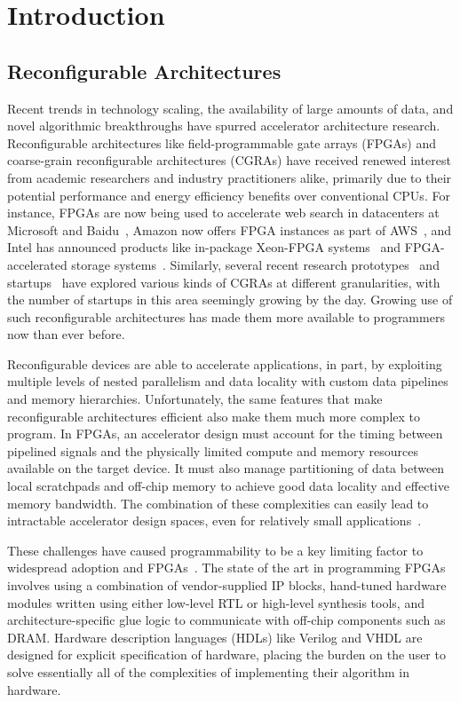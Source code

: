 \chapter{Introduction}
\label{intro}

\section{Reconfigurable Architectures}
Recent trends in technology scaling, the availability of large amounts of data,
and novel algorithmic breakthroughs have spurred accelerator architecture
research. Reconfigurable architectures like field-programmable gate arrays
(FPGAs) and coarse-grain reconfigurable architectures (CGRAs) have received
renewed interest from academic researchers and industry practitioners alike,
primarily due to their potential performance and energy efficiency benefits over
conventional CPUs. For instance, FPGAs are now being used to accelerate web search
in datacenters at Microsoft and Baidu~\cite{catapult, baidu},
Amazon now offers FPGA instances as part of AWS~\cite{awsf1},
and Intel has announced products like in-package Xeon-FPGA systems~\cite{harp}
and FPGA-accelerated storage systems~\cite{nand_flash}.
Similarly, several recent research prototypes~\cite{dyser, ti, scaledeep, scnn, plasticine}
and startups~\cite{wavecomp, nervana} have explored various
kinds of CGRAs at different granularities, with the number of startups in this
area seemingly growing by the day.
Growing use of such reconfigurable architectures has made them more available
to programmers now than ever before.

Reconfigurable devices are able to accelerate applications, in part, by exploiting multiple
levels of nested parallelism and data locality with custom data pipelines and memory hierarchies.
Unfortunately, the same features that make reconfigurable architectures efficient
also make them much more complex to program. In FPGAs, an accelerator design
must account for the timing between pipelined signals and the physically limited
compute and memory resources available on the target device.
It must also manage partitioning of data between local scratchpads and off-chip memory to achieve good data locality and effective memory bandwidth.
The combination of these complexities can easily lead to intractable accelerator design spaces, even for relatively small applications~\cite{cascaval}.

These challenges have caused programmability to be a key limiting factor to widespread adoption and FPGAs~\cite{fpgaMasses,DeSutter2013}.
The state of the art in programming FPGAs involves using a combination of vendor-supplied IP blocks,
hand-tuned hardware modules written using either low-level RTL or high-level synthesis tools,
and architecture-specific glue logic to communicate with off-chip components such as DRAM.
Hardware description languages (HDLs) like Verilog and VHDL are designed for explicit specification of hardware,
placing the burden on the user to solve essentially all of the complexities of implementing their algorithm in hardware.

